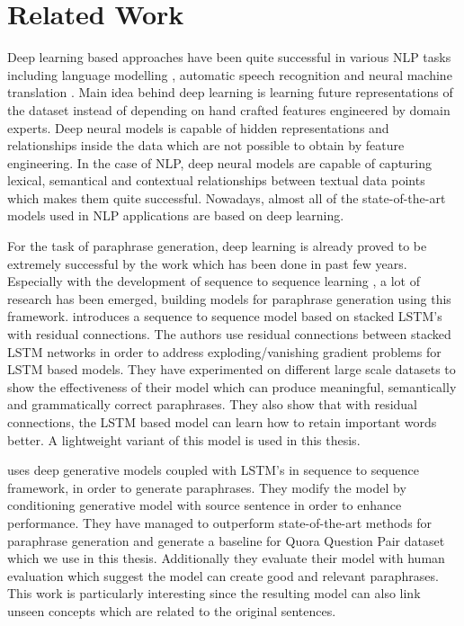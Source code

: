 \section{Related Work}

Deep learning based approaches have been quite successful in various NLP tasks including language modelling \cite{siriam}, automatic speech recognition \cite{hannun} and neural machine translation \cite{cho}. Main idea behind deep learning is learning future representations of the dataset instead of depending on hand crafted features engineered by domain experts. Deep neural models is capable of hidden representations and relationships inside the data which are not possible to obtain by feature engineering. In the case of NLP, deep neural models are capable of capturing lexical, semantical and contextual relationships between textual data points which makes them quite successful. Nowadays, almost all of the state-of-the-art models used in NLP applications are based on deep learning.

For the task of paraphrase generation, deep learning is already proved to be extremely successful by the work which has been done in past few years. Especially with the development of sequence to sequence learning \cite{Vinyalsetal}, a lot of research has been emerged, building models for paraphrase generation using this framework. \cite{Prakashetal} introduces a sequence to sequence model based on stacked LSTM's with residual connections. The authors use residual connections between stacked LSTM networks in order to address exploding/vanishing gradient problems for LSTM based models. They have experimented on different large scale datasets to show the effectiveness of their model which can produce meaningful, semantically and grammatically correct paraphrases. They also show that with residual connections, the LSTM based model can learn how to retain important words better. A lightweight variant of this model is used in this thesis.

\cite{Guptaetal} uses deep generative models coupled with LSTM's in sequence to sequence framework, in order to generate paraphrases. They modify the model by conditioning generative model with source sentence in order to enhance performance. They have managed to outperform state-of-the-art methods for paraphrase generation and generate a baseline for Quora Question Pair dataset which we use in this thesis. Additionally they evaluate their model with human evaluation which suggest the model can create good and relevant paraphrases. This work is particularly interesting since the resulting model can also link unseen concepts which are related to the original sentences.

